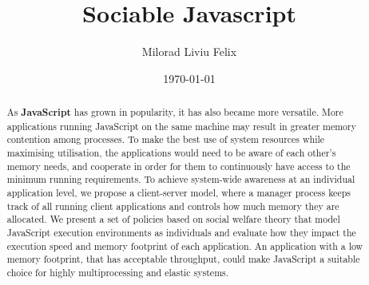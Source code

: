 \documentclass{l4proj}
\begin{document}
\title{Sociable Javascript}
\author{Milorad Liviu Felix}
\date{\today}
\maketitle
\educationalconsent
%
%
\newpage
\begin{abstract}
   As \textbf{JavaScript} has grown in popularity, it has also became more versatile. More applications running JavaScript on the same machine may result in greater memory contention among processes. To make the best use of system resources while maximising utilisation, the applications would need to be aware of each other's memory needs, and cooperate in order for them to continuously have access to the minimum running requirements. To achieve system-wide awareness at an individual application level, we propose a client-server model, where a manager process keeps track of all running client applications and controls how much memory they are allocated. We present a set of policies based on social welfare theory that model JavaScript execution environments as individuals and evaluate how they impact the execution speed and memory footprint of each application. An application with a low memory footprint, that has acceptable throughput, could make JavaScript a suitable choice for highly multiprocessing and elastic systems.
\end{abstract}
\newpage
\tableofcontents
\newpage
{}
\end{document}
